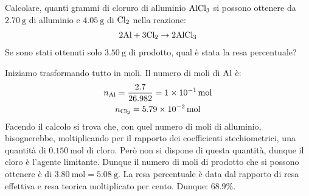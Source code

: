 \documentclass[../AppuntiChimica]{subfiles}
\begin{document}
	\begin{exe}
		Calcolare, quanti grammi di cloruro di alluminio $ \text{AlCl}_{3} $ si possono ottenere da $ \SI{2.70}{\gram} $ di alluminio e $ \SI{4.05}{\gram} $ di $ \text{Cl}_{2} $ nella reazione:
		\begin{gather}
		2\text{Al}+3\text{Cl}_{2}\to 2\text{AlCl}_{3}
		\end{gather}
		Se sono stati ottenuti solo $ \SI{3.50}{\gram} $ di prodotto, qual è stata la resa percentuale?
	\end{exe}
\begin{svol}
	Iniziamo trasformando tutto in moli. Il numero di moli di $ \text{Al} $ è:
	\begin{gather}
	n_{\text{Al}}=\dfrac{2.7}{26.982}=\SI{1e-1}{\mole} \\
	n_{\text{Cl}_{2}}=\SI{5.79e-2}{\mole}
	\end{gather}
		Facendo il calcolo si trova che, con quel numero di moli di alluminio, bisognerebbe, moltiplicando per il rapporto dei coefficienti stechiometrici, una quantità di $ \SI{0.150}{\mole} $ di cloro. Però non si dispone di questa quantità, dunque il cloro è l'agente limitante. Dunque il numero di moli di prodotto che si possono ottenere è di $ \SI{3.80}{\mole}=\SI{5.08}{\gram} $. La resa percentuale è data dal rapporto di resa effettiva e resa teorica moltiplicato per cento. Dunque: $ 68.9\% $.
	
	
\end{svol}
\end{document}
